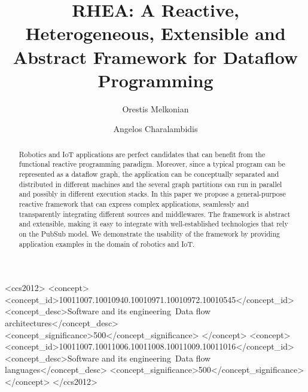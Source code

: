 \documentclass[sigplan,screen,10pt]{acmart}
\begin{document}
\sloppy %


\title[RHEA]{RHEA: A Reactive, Heterogeneous, Extensible and Abstract Framework for Dataflow Programming}

\author{Orestis Melkonian}

\author{Angelos Charalambidis}

\begin{abstract}
Robotics and IoT applications are perfect candidates that can benefit from
the functional reactive programming paradigm. Moreover, since a typical
program can be represented as a dataflow graph, the application can be conceptually
separated and distributed in different machines and the several graph partitions
can run in parallel and possibly in different execution stacks. In this paper
we propose a general-purpose reactive framework that can express complex
applications, seamlessly and transparently integrating different sources and
middlewares. The framework is abstract and extensible, making it easy to integrate
with well-established technologies that rely on the PubSub model. We demonstrate
the usability of the framework by providing application examples in the domain of
robotics and IoT.
\end{abstract}

\begin{CCSXML} <ccs2012> <concept>
<concept_id>10011007.10010940.10010971.10010972.10010545</concept_id>
<concept_desc>Software and its engineering~Data flow
architectures</concept_desc> <concept_significance>500</concept_significance>
</concept> <concept>
<concept_id>10011007.10011006.10011008.10011009.10011016</concept_id>
<concept_desc>Software and its engineering~Data flow languages</concept_desc>
<concept_significance>500</concept_significance> </concept> </ccs2012>
\end{CCSXML}

\end{document}
